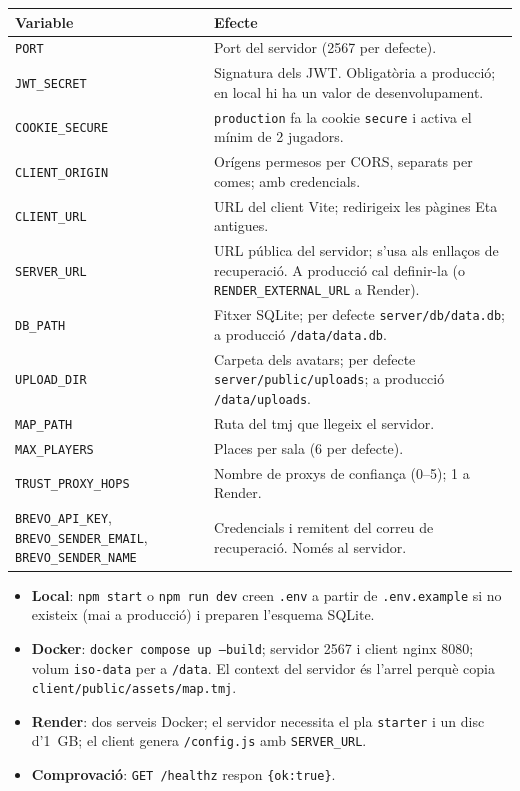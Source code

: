 \documentclass[10pt,a4paper]{article}
\begin{document}
\begin{table}[ht]
\small
\begin{tabularx}{\textwidth}{@{}p{3.7cm}X@{}}
\toprule
\textbf{Variable} & \textbf{Efecte} \\
\midrule
\texttt{PORT} & Port del servidor (2567 per defecte). \\
\texttt{JWT\_SECRET} & Signatura dels JWT\@. Obligatòria a producció; en local hi ha un
valor de desenvolupament. \\
\texttt{COOKIE\_SECURE} & \texttt{production} fa la cookie \texttt{secure} i activa el
mínim de 2 jugadors. \\
\texttt{CLIENT\_ORIGIN} & Orígens permesos per CORS, separats per comes; amb
credencials. \\
\texttt{CLIENT\_URL} & URL del client Vite; redirigeix les pàgines Eta antigues. \\
\texttt{SERVER\_URL} & URL pública del servidor; s'usa als enllaços de recuperació.
A producció cal definir-la (o \texttt{RENDER\_EXTERNAL\_URL} a Render). \\
\texttt{DB\_PATH} & Fitxer SQLite; per defecte \texttt{server/db/data.db}; a producció
\texttt{/data/data.db}. \\
\texttt{UPLOAD\_DIR} & Carpeta dels avatars; per defecte
\texttt{server/public/uploads}; a producció \texttt{/data/uploads}. \\
\texttt{MAP\_PATH} & Ruta del tmj que llegeix el servidor. \\
\texttt{MAX\_PLAYERS} & Places per sala (6 per defecte). \\
\texttt{TRUST\_PROXY\_HOPS} & Nombre de proxys de confiança (0--5); 1 a Render. \\
\texttt{BREVO\_API\_KEY}, \texttt{BREVO\_SENDER\_EMAIL}, \texttt{BREVO\_SENDER\_NAME} &
Credencials i remitent del correu de recuperació. Només al servidor. \\
\bottomrule
\end{tabularx}
\end{table}

\begin{itemize}[nosep]
  \item \textbf{Local}: \texttt{npm start} o \texttt{npm run dev} creen \texttt{.env}
        a partir de \texttt{.env.example} si no existeix (mai a producció) i preparen
        l'esquema SQLite.
  \item \textbf{Docker}: \texttt{docker compose up --build}; servidor 2567 i client
        nginx 8080; volum \texttt{iso-data} per a \texttt{/data}. El context del
        servidor és l'arrel perquè copia \texttt{client/public/assets/map.tmj}.
  \item \textbf{Render}: dos serveis Docker; el servidor necessita el pla
        \texttt{starter} i un disc d'1~GB; el client genera \texttt{/config.js} amb
        \texttt{SERVER\_URL}.
  \item \textbf{Comprovació}: \texttt{GET /healthz} respon \texttt{\{ok:true\}}.
\end{itemize}
\end{document}
